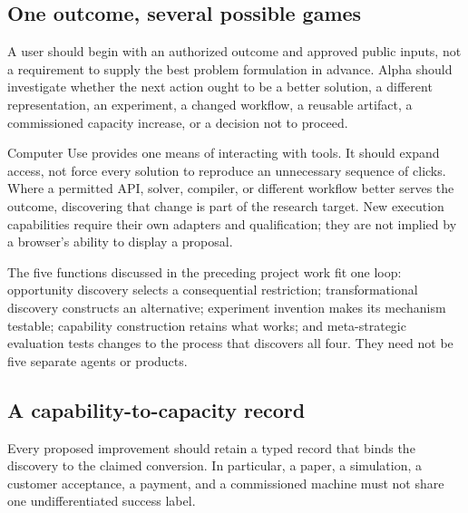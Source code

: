\documentclass[11pt,letterpaper]{article}
\newcommand{\1}{\mathbf 1}
\theoremstyle{remark}\newtheorem{remark}{Remark}[section]
\begin{document}
\subsection{One outcome, several possible games}
A user should begin with an authorized outcome and approved public inputs, not a requirement to supply the best problem formulation in advance. Alpha should investigate whether the next action ought to be a better solution, a different representation, an experiment, a changed workflow, a reusable artifact, a commissioned capacity increase, or a decision not to proceed.

Computer Use provides one means of interacting with tools. It should expand access, not force every solution to reproduce an unnecessary sequence of clicks. Where a permitted API, solver, compiler, or different workflow better serves the outcome, discovering that change is part of the research target. New execution capabilities require their own adapters and qualification; they are not implied by a browser's ability to display a proposal.

The five functions discussed in the preceding project work fit one loop: opportunity discovery selects a consequential restriction; transformational discovery constructs an alternative; experiment invention makes its mechanism testable; capability construction retains what works; and meta-strategic evaluation tests changes to the process that discovers all four. They need not be five separate agents or products.

\subsection{A capability-to-capacity record}
Every proposed improvement should retain a typed record that binds the discovery to the claimed conversion. In particular, a paper, a simulation, a customer acceptance, a payment, and a commissioned machine must not share one undifferentiated success label.
\end{document}
